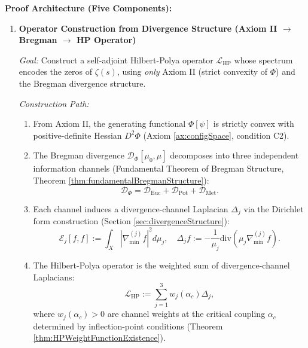 \begin{theorem}
\begin{lemma}
\end{lemma}

\textbf{Proof Architecture (Five Components):}

\begin{enumerate}

\item[\textbf{Component 1:}] \textbf{Operator Construction from Divergence Structure (Axiom II $\rightarrow$ Bregman $\rightarrow$ HP Operator)}

\textit{Goal:} Construct a self-adjoint Hilbert-Polya operator $\mathcal{L}_{\mathrm{HP}}$ whose spectrum encodes the zeros of $\zeta(s)$, using \emph{only} Axiom II (strict convexity of $\Phi$) and the Bregman divergence structure.

\textit{Construction Path:}
\begin{enumerate}
\item[(1a)] From Axiom II, the generating functional $\Phi[\psi]$ is strictly convex with positive-definite Hessian $D^2\Phi$ (Axiom \ref{ax:configSpace}, condition C2).

\item[(1b)] The Bregman divergence $\mathcal{D}_\Phi[\mu_0, \mu]$ decomposes into three independent information channels (Fundamental Theorem of Bregman Structure, Theorem \ref{thm:fundamentalBregmanStructure}):
\begin{equation}
\mathcal{D}_\Phi = \mathcal{D}_{\text{Euc}} + \mathcal{D}_{\text{Pot}} + \mathcal{D}_{\text{Met}}.
\end{equation}

\item[(1c)] Each channel induces a divergence-channel Laplacian $\Delta_j$ via the Dirichlet form construction (Section \ref{sec:divergenceStructure}):
\begin{equation}
\mathcal{E}_j[f, f] := \int_X |\nabla_{\min}^{(j)} f|^2 d\mu_j, \quad \Delta_j f := -\frac{1}{\mu_j} \mathrm{div}(\mu_j \nabla_{\min}^{(j)} f).
\end{equation}

\item[(1d)] The Hilbert-Polya operator is the weighted sum of divergence-channel Laplacians:
\begin{equation}
\mathcal{L}_{\mathrm{HP}} := \sum_{j=1}^{3} w_j(\alpha_c) \Delta_j,
\end{equation}
where $w_j(\alpha_c) > 0$ are channel weights at the critical coupling $\alpha_c$ determined by inflection-point conditions (Theorem \ref{thm:HPWeightFunctionExistence}).


\end{enumerate}
\end{enumerate}
\end{theorem}
